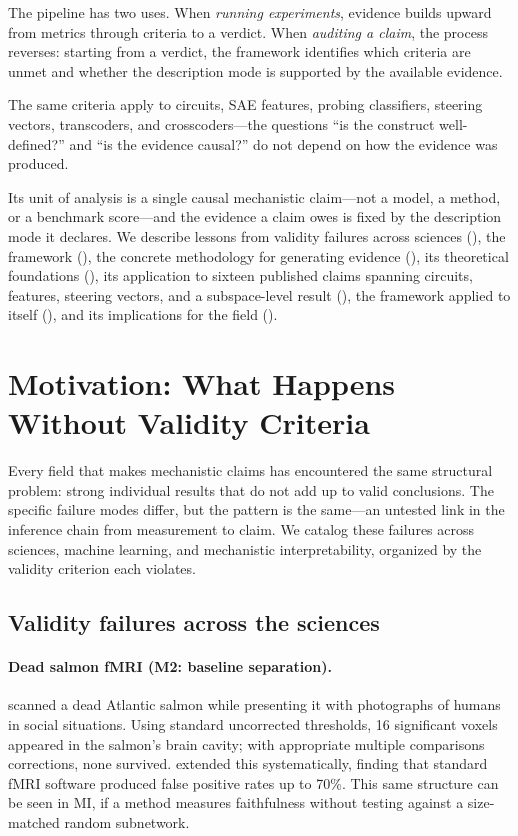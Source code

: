 \documentclass{article}
\begin{document}
The pipeline has two uses. When \emph{running experiments}, evidence builds upward from metrics through criteria to a verdict. When \emph{auditing a claim}, the process reverses: starting from a verdict, the framework identifies which criteria are unmet and whether the description mode is supported by the available evidence.

The same criteria apply to circuits, SAE features, probing classifiers, steering vectors, transcoders, and crosscoders---the questions ``is the construct well-defined?'' and ``is the evidence causal?'' do not depend on how the evidence was produced.

Its unit of analysis is a single causal mechanistic claim---not a model, a method, or a benchmark score---and the evidence a claim owes is fixed by the description mode it declares. We describe lessons from validity failures across sciences (), the framework (), the concrete methodology for generating evidence (), its theoretical foundations (), its application to sixteen published claims spanning circuits, features, steering vectors, and a subspace-level result (), the framework applied to itself (), and its implications for the field ().


\section{Motivation: What Happens Without Validity Criteria}
\label{sec:motivation}

Every field that makes mechanistic claims has encountered the same structural problem: strong individual results that do not add up to valid conclusions. The specific failure modes differ, but the pattern is the same---an untested link in the inference chain from measurement to claim. We catalog these failures across sciences, machine learning, and mechanistic interpretability, organized by the validity criterion each violates.

\subsection{Validity failures across the sciences}

\paragraph{Dead salmon fMRI (M2: baseline separation).}
\citet{bennett2010neural} scanned a dead Atlantic salmon while presenting it with photographs of humans in social situations. Using standard uncorrected thresholds, 16 significant voxels appeared in the salmon's brain cavity; with appropriate multiple comparisons corrections, none survived. \citet{eklund2016cluster} extended this systematically, finding that standard fMRI software produced false positive rates up to 70\%. This same structure can be seen in MI, if a method measures faithfulness without testing against a size-matched random subnetwork.
\end{document}
